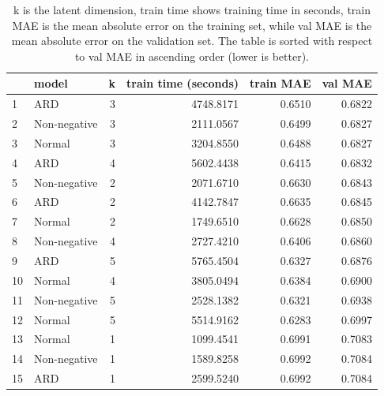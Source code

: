 \documentclass[12pt]{article}
\begin{document}
    \begin{table}[H]
        \centering
        \caption{k is the latent dimension, train time shows training time in seconds, train MAE is the mean absolute error on the training set, while val MAE is the mean absolute error on the validation set. The table is sorted with respect to val MAE in ascending order (lower is better).}
        \label{table:modelselection}
        \begin{tabular}{llrr|rr}
            \toprule
            {} &         model &  k &  train time (seconds) &  train MAE &  val MAE \\
            \midrule
            1  &           ARD &  3 &             4748.8171 &     0.6510 &   0.6822 \\
            2  &  Non-negative &  3 &             2111.0567 &     0.6499 &   0.6827 \\
            3  &        Normal &  3 &             3204.8550 &     0.6488 &   0.6827 \\
            4  &           ARD &  4 &             5602.4438 &     0.6415 &   0.6832 \\
            5  &  Non-negative &  2 &             2071.6710 &     0.6630 &   0.6843 \\
            6  &           ARD &  2 &             4142.7847 &     0.6635 &   0.6845 \\
            7  &        Normal &  2 &             1749.6510 &     0.6628 &   0.6850 \\
            8  &  Non-negative &  4 &             2727.4210 &     0.6406 &   0.6860 \\
            9  &           ARD &  5 &             5765.4504 &     0.6327 &   0.6876 \\
            10 &        Normal &  4 &             3805.0494 &     0.6384 &   0.6900 \\
            11 &  Non-negative &  5 &             2528.1382 &     0.6321 &   0.6938 \\
            12 &        Normal &  5 &             5514.9162 &     0.6283 &   0.6997 \\
            13 &        Normal &  1 &             1099.4541 &     0.6991 &   0.7083 \\
            14 &  Non-negative &  1 &             1589.8258 &     0.6992 &   0.7084 \\
            15 &           ARD &  1 &             2599.5240 &     0.6992 &   0.7084 \\
            \bottomrule
        \end{tabular}
    \end{table}
    
\end{document}
